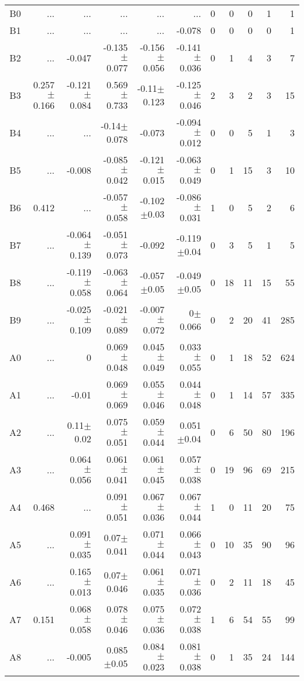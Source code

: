 \begin{table}[t]
\begin{table}[t]
\begin{center}
\begin{tabular}{c|rrrrr|rrrrr}
    B0	&	 ...	&	 ...	&	 ...	&	 ...	&	 ...	&	0	&	0	&	0	&	1	&	1	\\
    B1	&	 ...	&	 ...	&	 ...	&	 ...	&	-0.078	&	0	&	0	&	0	&	0	&	1	\\
    B2	&	 ...	&	-0.047	&	-0.135$\pm$0.077	&	-0.156$\pm$0.056	&	-0.141$\pm$0.036	&	0	&	1	&	4	&	3	&	7	\\
    B3	&	0.257$\pm$0.166	&	-0.121$\pm$0.084	&	0.569$\pm$0.733	&	-0.11$\pm$0.123	&	-0.125$\pm$0.046	&	2	&	3	&	2	&	3	&	15	\\
    B4	&	 ...	&	 ...	&	-0.14$\pm$0.078	&	-0.073	&	-0.094$\pm$0.012	&	0	&	0	&	5	&	1	&	3	\\
    B5	&	 ...	&	-0.008	&	-0.085$\pm$0.042	&	-0.121$\pm$0.015	&	-0.063$\pm$0.049	&	0	&	1	&	15	&	3	&	10	\\
    B6	&	0.412	&	 ...	&	-0.057$\pm$0.058	&	-0.102$\pm$0.03	&	-0.086$\pm$0.031	&	1	&	0	&	5	&	2	&	6	\\
    B7	&	 ...	&	-0.064$\pm$0.139	&	-0.051$\pm$0.073	&	-0.092	&	-0.119$\pm$0.04	&	0	&	3	&	5	&	1	&	5	\\
    B8	&	 ...	&	-0.119$\pm$0.058	&	-0.063$\pm$0.064	&	-0.057$\pm$0.05	&	-0.049$\pm$0.05	&	0	&	18	&	11	&	15	&	55	\\
    B9	&	 ...	&	-0.025$\pm$0.109	&	-0.021$\pm$0.089	&	-0.007$\pm$0.072	&	0$\pm$0.066	&	0	&	2	&	20	&	41	&	285	\\
    A0	&	 ...	&	0	&	0.069$\pm$0.048	&	0.045$\pm$0.049	&	0.033$\pm$0.055	&	0	&	1	&	18	&	52	&	624	\\
    A1	&	 ...	&	-0.01	&	0.069$\pm$0.069	&	0.055$\pm$0.046	&	0.044$\pm$0.048	&	0	&	1	&	14	&	57	&	335	\\
    A2	&	 ...	&	0.11$\pm$0.02	&	0.075$\pm$0.051	&	0.059$\pm$0.044	&	0.051$\pm$0.04	&	0	&	6	&	50	&	80	&	196	\\
    A3	&	 ...	&	0.064$\pm$0.056	&	0.061$\pm$0.041	&	0.061$\pm$0.045	&	0.057$\pm$0.038	&	0	&	19	&	96	&	69	&	215	\\
    A4	&	0.468	&	 ...	&	0.091$\pm$0.051	&	0.067$\pm$0.036	&	0.067$\pm$0.044	&	1	&	0	&	11	&	20	&	75	\\
    A5	&	 ...	&	0.091$\pm$0.035	&	0.07$\pm$0.041	&	0.071$\pm$0.044	&	0.066$\pm$0.043	&	0	&	10	&	35	&	90	&	96	\\
    A6	&	 ...	&	0.165$\pm$0.013	&	0.07$\pm$0.046	&	0.061$\pm$0.035	&	0.071$\pm$0.036	&	0	&	2	&	11	&	18	&	45	\\
    A7	&	0.151	&	0.068$\pm$0.058	&	0.078$\pm$0.046	&	0.075$\pm$0.036	&	0.072$\pm$0.038	&	1	&	6	&	54	&	55	&	99	\\
    A8	&	 ...	&	-0.005	&	0.085$\pm$0.05	&	0.084$\pm$0.023	&	0.081$\pm$0.038	&	0	&	1	&	35	&	24	&	144	\\

\end{tabular}
\end{center}
\end{table}
\end{table}
